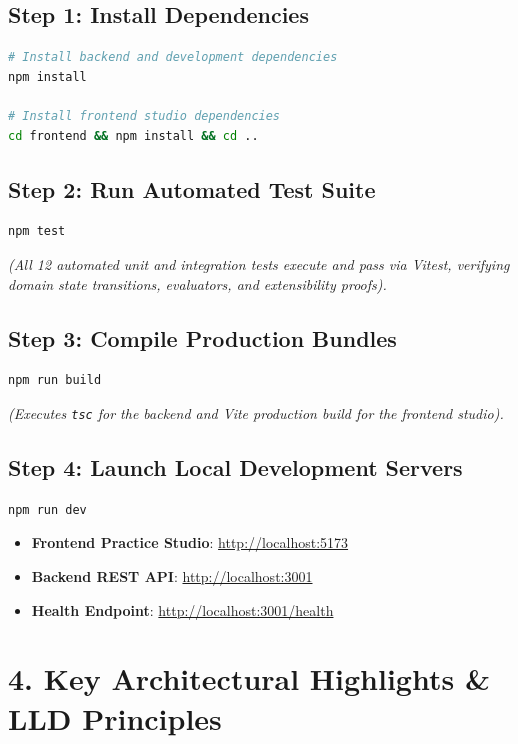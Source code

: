 \documentclass[10pt,a4paper]{article}
\begin{document}
\subsection{Step 1: Install Dependencies}
\begin{lstlisting}[language=bash]
# Install backend and development dependencies
npm install

# Install frontend studio dependencies
cd frontend && npm install && cd ..
\end{lstlisting}

\subsection{Step 2: Run Automated Test Suite}
\begin{lstlisting}[language=bash]
npm test
\end{lstlisting}
\textit{(All 12 automated unit and integration tests execute and pass via Vitest, verifying domain state transitions, evaluators, and extensibility proofs).}

\subsection{Step 3: Compile Production Bundles}
\begin{lstlisting}[language=bash]
npm run build
\end{lstlisting}
\textit{(Executes \texttt{tsc} for the backend and Vite production build for the frontend studio).}

\subsection{Step 4: Launch Local Development Servers}
\begin{lstlisting}[language=bash]
npm run dev
\end{lstlisting}
\begin{itemize}
  \item \textbf{Frontend Practice Studio}: \url{http://localhost:5173}
  \item \textbf{Backend REST API}: \url{http://localhost:3001}
  \item \textbf{Health Endpoint}: \url{http://localhost:3001/health}
\end{itemize}

\section{4. Key Architectural Highlights \& LLD Principles}
\end{document}
